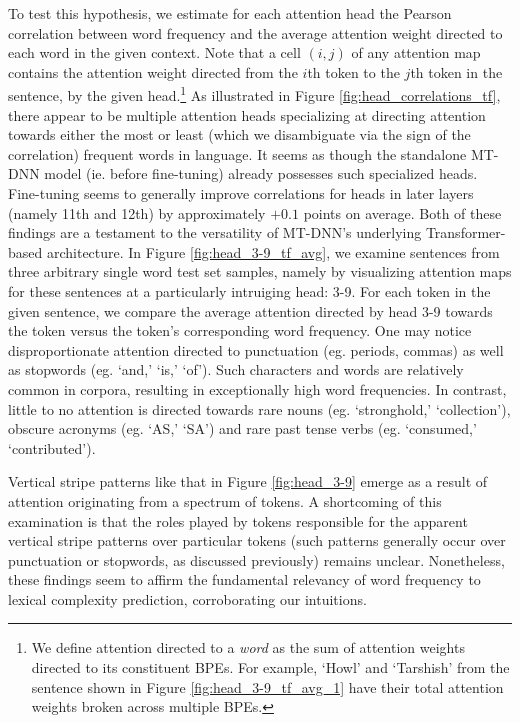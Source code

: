 \documentclass{dcthesis}
\theoremstyle{definition}
\theoremstyle{remark}
\begin{document}
To test this hypothesis, we estimate for each attention head the Pearson correlation between word frequency and the average attention weight directed to each word in the given context. Note that a cell $(i,j)$ of any attention map contains the attention weight directed from the $i$th token to the $j$th token in the sentence, by the given head.\footnote{We define attention directed to a \textit{word} as the sum of attention weights directed to its constituent BPEs. For example, `Howl' and `Tarshish' from the sentence shown in Figure \ref{fig:head_3-9_tf_avg_1} have their total attention weights broken across multiple BPEs.} As illustrated in Figure \ref{fig:head_correlations_tf}, there appear to be multiple attention heads specializing at directing attention towards either the most or least (which we disambiguate via the sign of the correlation) frequent words in language. It seems as though the standalone MT-DNN model (ie. before fine-tuning) already possesses such specialized heads. Fine-tuning seems to generally improve correlations for heads in later layers (namely 11th and 12th) by approximately $+0.1$ points on average. Both of these findings are a testament to the versatility of MT-DNN's underlying Transformer-based architecture. In Figure \ref{fig:head_3-9_tf_avg}, we examine sentences from three arbitrary single word test set samples, namely by visualizing attention maps for these sentences at a particularly intruiging head: 3-9. For each token in the given sentence, we compare the average attention directed by head 3-9 towards the token versus the token's corresponding word frequency. One may notice disproportionate attention directed to punctuation (eg. periods, commas) as well as stopwords (eg. `and,' `is,' `of'). Such characters and words are relatively common in corpora, resulting in exceptionally high word frequencies. In contrast, little to no attention is directed towards rare nouns (eg. `stronghold,' `collection'), obscure acronyms (eg. `AS,' `SA') and rare past tense verbs (eg. `consumed,' `contributed'). 

Vertical stripe patterns like that in Figure \ref{fig:head_3-9} emerge as a result of attention originating from a spectrum of tokens. A shortcoming of this examination is that the roles played by tokens responsible for the apparent vertical stripe patterns over particular tokens (such patterns generally occur over punctuation or stopwords, as discussed previously) remains unclear. Nonetheless, these findings seem to affirm the fundamental relevancy of word frequency to lexical complexity prediction, corroborating our intuitions.
\end{document}

